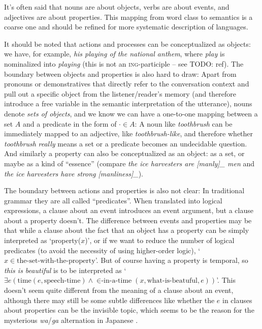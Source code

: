 \documentclass[UTF8, a4paper, oneside, scheme=plain, 12pt]{ctexbook}
\newcommand{\form}[1]{\emph{#1}}
\newcommand{\formcat}[1]{\textsc{#1}}
\newcommand{\translate}[1]{`#1'}
\begin{document}
{It's often said that nouns are about objects, 
verbs are about events,
and adjectives are about properties.
This mapping from word class to semantics is a coarse one 
and should be refined for more systematic description of languages.

It should be noted that actions and processes can be conceptualized as objects:
we have, for example, \form{his playing of the national anthem},
where \form{play} is nominalized into \form{playing}
(this is not an \formcat{ing}-participle -- see TODO: ref).
The boundary between objects and properties is also hard to draw:
Apart from pronouns or demonstratives 
that directly refer to the conversation context 
and pull out a specific object from the listener/reader's memory
(and therefore introduce a free variable in the semantic interpretation of the utterance),
nouns denote \emph{sets of objects},
and we know we can have a one-to-one mapping 
between a set $A$ and a predicate in the form of $\cdot \in A$:
A noun like \form{toothbrush} 
can be immediately mapped to an adjective, like \form{toothbrush-like},
and therefore whether \form{toothbrush} \emph{really} means 
a set or a predicate becomes an undecidable question.
And similarly a property can also be conceptualized as an object: 
as a set, or maybe as a kind of ``essence''
(compare \form{the ice harvesters are [manly]_{} men}
and \form{the ice harvesters have strong [manliness]_{}}).

The boundary between actions and properties is also not clear:
In traditional grammar they are all called ``predicates''.
When translated into logical expressions,
a clause about an event introduces an event argument,
but a clause about a property doesn't.
The difference between events and properties may be that
while a clause about the fact that an object has a property 
can be simply interpreted as \translate{property($x$)},
or if we want to reduce the number of logical predicates 
(to avoid the necessity of using higher-order logic),
\translate{$x \in \text{the-set-with-the-property}$}.
But of course having a property is temporal,
so \form{this is beautiful} is to be interpreted as 
\translate{$\exists e (\text{time}(e, \text{speech-time}) \land 
\text{$\in$-in-a-time}(x, \text{what-is-beatuful}, e) )$}.
This doesn't seem quite different from the meaning of a clause about an event,
although there may still be some subtle differences like 
whether the $e$ in clauses about properties can be the invisible topic, 
which seems to be the reason for the mysterious \form{wa}/\form{ga} alternation in Japanese
\citep{heycock2008}.

}
\end{document}
